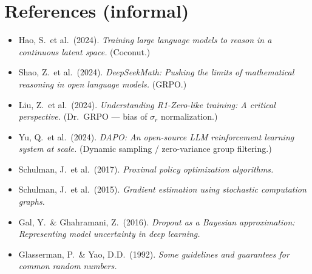 \documentclass[11pt]{article}
\theoremstyle{definition}
\theoremstyle{remark}
\begin{document}
\section*{References (informal)}

\begin{itemize}[topsep=2pt,itemsep=1pt,leftmargin=*]
\item Hao, S.\ et al.\ (2024). \emph{Training large language models to reason
      in a continuous latent space.}  (Coconut.)
\item Shao, Z.\ et al.\ (2024).  \emph{DeepSeekMath: Pushing the limits of
      mathematical reasoning in open language models.} (GRPO.)
\item Liu, Z.\ et al.\ (2024).  \emph{Understanding R1-Zero-like training:
      A critical perspective.} (Dr.\ GRPO --- bias of $\sigma_r$
      normalization.)
\item Yu, Q.\ et al.\ (2024).  \emph{DAPO: An open-source LLM reinforcement
      learning system at scale.}  (Dynamic sampling / zero-variance group
      filtering.)
\item Schulman, J.\ et al.\ (2017).  \emph{Proximal policy optimization
      algorithms.}
\item Schulman, J.\ et al.\ (2015).  \emph{Gradient estimation using
      stochastic computation graphs.}
\item Gal, Y.\ \& Ghahramani, Z.\ (2016).  \emph{Dropout as a Bayesian
      approximation: Representing model uncertainty in deep learning.}
\item Glasserman, P.\ \& Yao, D.D.\ (1992).  \emph{Some guidelines and
      guarantees for common random numbers.}
\end{itemize}
\end{document}
